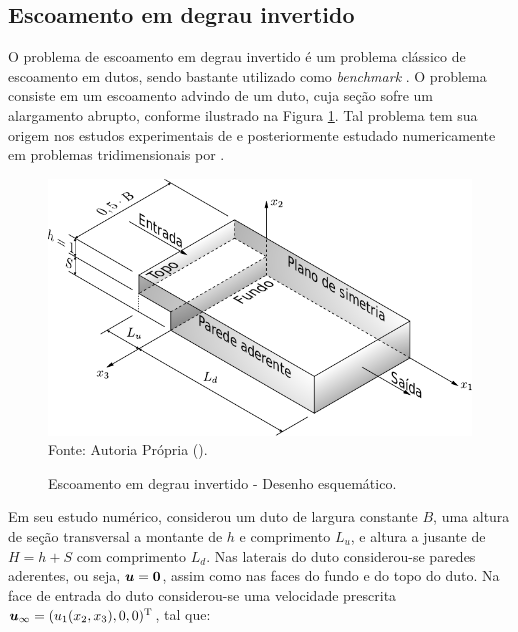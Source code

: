 \newpage
\subsection{Escoamento em degrau invertido} \label{ex:backwardFacingStep}

O problema de escoamento em degrau invertido é um problema clássico de escoamento em dutos, sendo bastante utilizado como \textit{benchmark} \cite{armaly1983experimental,chiang1999numerical}. O problema consiste em um escoamento advindo de um duto, cuja seção sofre um alargamento abrupto, conforme ilustrado na Figura \ref{fig:step}. Tal problema tem sua origem nos estudos experimentais de  e posteriormente estudado numericamente em problemas tridimensionais por .

\begin{figure}[h!]
    \centering
    \caption{Escoamento em degrau invertido - Desenho esquemático.}
    \includegraphics[width=.7\linewidth]{Figuras/backwardFacingStep/backwardFacingStep.pdf}
    \\Fonte: Autoria Própria (\the\year).
    \label{fig:step}
\end{figure}

Em seu estudo numérico,  considerou um duto de largura constante $B$, uma altura de seção transversal a montante de $h$ e comprimento $L_u$, e altura a jusante de $H=h+S$ com comprimento $L_d$. Nas laterais do duto considerou-se paredes aderentes, ou seja, $\boldsymbol{u}=\boldsymbol{0}$, assim como nas faces do fundo e do topo do duto. Na face de entrada do duto considerou-se uma velocidade prescrita $\boldsymbol{u}_\infty=(u_1(x_2,x_3),0,0)^\mathrm{T}$, tal que:

